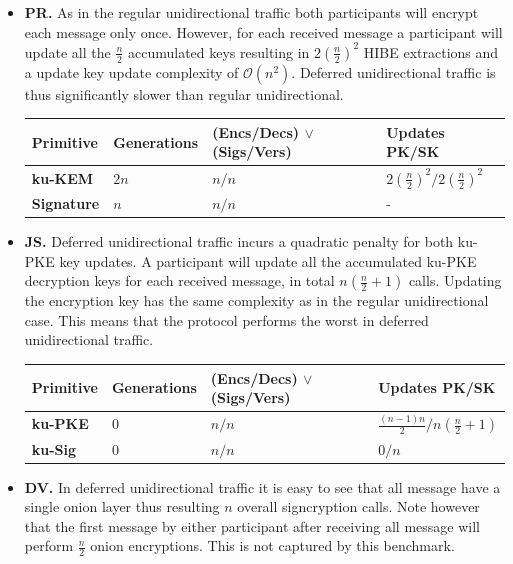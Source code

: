 \documentclass[11pt,a4paper,twoside,openright,bibliography=totoc]{scrbook}
\begin{document}
\begin{itemize}
\item \textbf{PR.} As in the regular unidirectional traffic both
  participants will encrypt each message only once. However, for
  each received message a participant will update all
  the $\frac{n}{2}$ accumulated keys resulting in $2(\frac{n}{2})^2$
  HIBE extractions and a update key update complexity of $\mathcal{O}(n^2)$.
  Deferred unidirectional traffic is thus significantly slower than
  regular unidirectional.
  \begin{center}
    \begin{tabular}{ | l | l | l | l |}
    \hline
    Primitive & Generations & (Encs/Decs) $\vee$ (Sigs/Vers) & Updates PK/SK \\ \hline
    \textbf{ku-KEM} & $2n$ & $n/n$ & $2(\frac{n}{2})^2/2(\frac{n}{2})^2$ \\ \hline
    \textbf{Signature} & $n$ & $n/n$ & - \\  
    \hline
    \end{tabular}
  \end{center}
\item \textbf{JS.} Deferred unidirectional traffic incurs a quadratic
  penalty for both ku-PKE key updates. A participant
  will update all the accumulated ku-PKE decryption keys for
  each received message, in total $n(\frac{n}{2}+1)$ calls.
  Updating the encryption key has the same complexity as in the
  regular unidirectional case. This means that the protocol
  performs the worst in deferred unidirectional traffic.
  \begin{center}
    \begin{tabular}{ | l | l | l | l |}
    \hline
    Primitive & Generations & (Encs/Decs) $\vee$ (Sigs/Vers) & Updates PK/SK \\ \hline
    \textbf{ku-PKE} & $0$ & $n/n$ & $\frac{(n-1)n}{2}/n(\frac{n}{2}+1)$ \\ \hline
    \textbf{ku-Sig} & $0$ & $n/n$ & $0/n$ \\  
    \hline
    \end{tabular}
  \end{center}
\item \textbf{DV.} In deferred unidirectional traffic it is easy to see that
  all message have a single onion layer thus resulting $n$ overall
  signcryption calls. Note however that the first message
  by either participant after receiving all message will perform
  $\frac{n}{2}$ onion encryptions. This is not captured
  by this benchmark.
  \begin{center}

\end{center}
\end{itemize}
\end{document}
